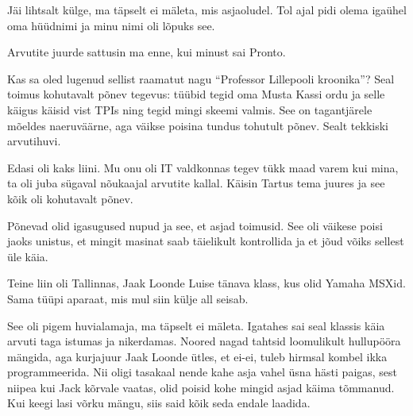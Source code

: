 \label{sisu:pronto}


Jäi lihtsalt külge, ma täpselt ei mäleta, mis asjaoludel. Tol 
ajal pidi olema igaühel oma hüüdnimi ja minu nimi oli lõpuks see.


Arvutite juurde sattusin ma enne, kui minust sai Pronto.

Kas sa oled lugenud sellist raamatut nagu \enquote{Professor Lillepooli 
kroonika}? 
Seal toimus kohutavalt põnev tegevus: tüübid tegid oma Musta Kassi 
ordu ja selle käigus käisid vist TPIs ning tegid mingi skeemi 
valmis. See on tagantjärele mõeldes naeruväärne, aga väikse poisina tundus 
tohutult põnev. Sealt tekkiski arvutihuvi. 

Edasi oli kaks liini. Mu onu oli IT valdkonnas tegev 
tükk maad varem kui mina, ta oli juba sügaval 
nõukaajal arvutite kallal. Käisin Tartus tema juures ja see kõik oli kohutavalt põnev.


Põnevad olid igasugused nupud ja see, et asjad toimusid. 
See oli väikese poisi jaoks unistus, et mingit masinat saab täielikult kontrollida ja et jõud võiks sellest üle käia.

Teine liin oli Tallinnas, Jaak 
Loonde Luise tänava klass, kus olid Yamaha 
MSXid. Sama tüüpi aparaat, mis mul siin külje all 
seisab.


See oli pigem huvialamaja, ma täpselt ei mäleta. Igatahes sai seal klassis käia arvuti taga istumas ja nikerdamas. Noored nagad tahtsid 
loomulikult hullupööra mängida, aga kurjajuur Jaak Loonde
ütles, et ei-ei, tuleb hirmsal kombel ikka programmeerida. Nii oligi 
tasakaal nende kahe asja vahel üsna hästi paigas, sest niipea kui 
Jack kõrvale vaatas, olid poisid kohe mingid asjad käima tõmmanud. Kui 
keegi lasi võrku mängu, siis said kõik seda endale laadida. 

